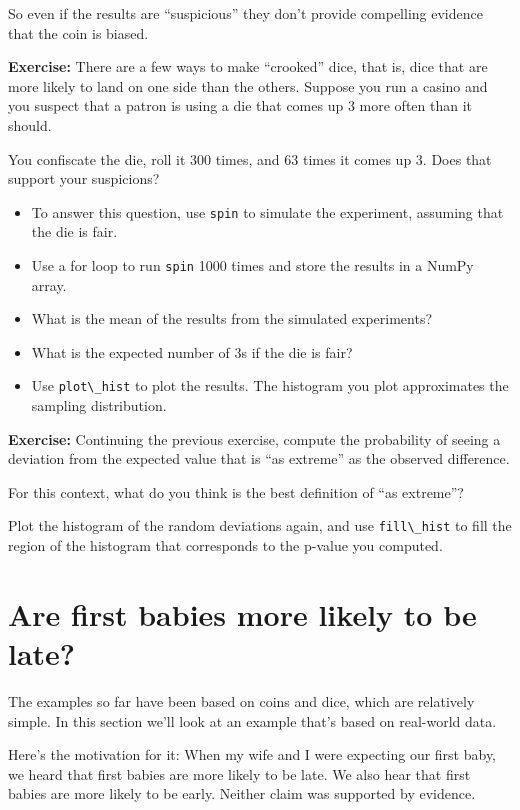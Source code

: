 So even if the results are ``suspicious'' they don't provide compelling
evidence that the coin is biased.

\textbf{Exercise:} There are a few ways to make ``crooked'' dice, that
is, dice that are more likely to land on one side than the others.
Suppose you run a casino and you suspect that a patron is using a die
that comes up 3 more often than it should.

You confiscate the die, roll it 300 times, and 63 times it comes up 3.
Does that support your suspicions?

\begin{itemize}
\item
  To answer this question, use \passthrough{\lstinline!spin!} to
  simulate the experiment, assuming that the die is fair.
\item
  Use a for loop to run \passthrough{\lstinline!spin!} 1000 times and
  store the results in a NumPy array.
\item
  What is the mean of the results from the simulated experiments?
\item
  What is the expected number of 3s if the die is fair?
\item
  Use \passthrough{\lstinline!plot\_hist!} to plot the results. The
  histogram you plot approximates the sampling distribution.
\end{itemize}

\textbf{Exercise:} Continuing the previous exercise, compute the
probability of seeing a deviation from the expected value that is ``as
extreme'' as the observed difference.

For this context, what do you think is the best definition of ``as
extreme''?

Plot the histogram of the random deviations again, and use
\passthrough{\lstinline!fill\_hist!} to fill the region of the histogram
that corresponds to the p-value you computed.

\hypertarget{are-first-babies-more-likely-to-be-late}{%
\section{Are first babies more likely to be
late?}\label{are-first-babies-more-likely-to-be-late}}

The examples so far have been based on coins and dice, which are
relatively simple. In this section we'll look at an example that's based
on real-world data.

Here's the motivation for it: When my wife and I were expecting our
first baby, we heard that first babies are more likely to be late. We
also hear that first babies are more likely to be early. Neither claim
was supported by evidence.

